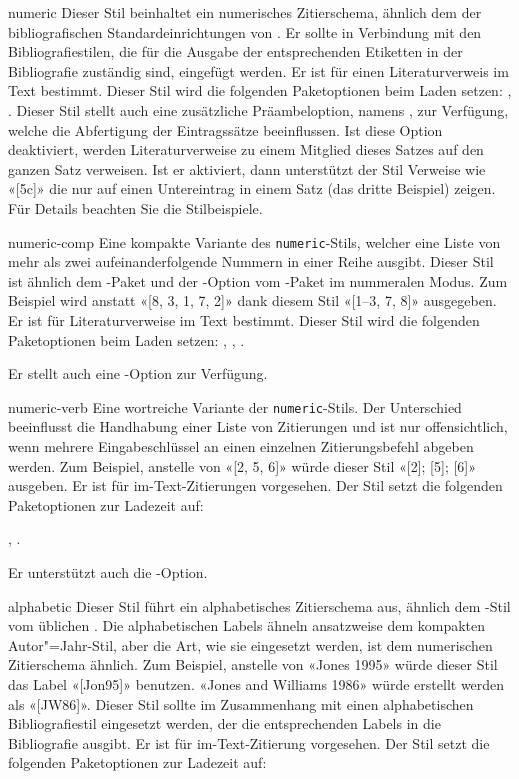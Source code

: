 \documentclass{ltxdockit}[2011/03/25]
\begin{document}
\begin{marglist}

\item[numeric] Dieser Stil beinhaltet ein numerisches Zitierschema, ähnlich dem
der bibliografischen Standardeinrichtungen von \latex. Er sollte in Verbindung
mit den Bibliografiestilen, die für die Ausgabe der entsprechenden Etiketten in
der Bibliografie zuständig sind, eingefügt werden. Er ist für einen
Literaturverweis im Text bestimmt. Dieser Stil wird die folgenden Paketoptionen
beim Laden setzen: , . Dieser
Stil stellt auch eine zusätzliche Präambeloption, namens , zur
Verfügung, welche die Abfertigung der Eintragssätze beeinflussen. Ist diese
Option deaktiviert, werden Literaturverweise zu einem Mitglied dieses Satzes auf
den ganzen Satz verweisen. Ist er aktiviert, dann unterstützt der Stil Verweise
wie «[5c]» die nur auf einen Untereintrag in einem Satz (das dritte Beispiel)
zeigen. Für Details beachten Sie die Stilbeispiele.


\item[numeric-comp] Eine kompakte Variante des \texttt{numeric}-Stils,
welcher
eine Liste von mehr als zwei aufeinanderfolgende Nummern in einer Reihe ausgibt.
Dieser Stil ist ähnlich dem -Paket und der -Option
vom -Paket im nummeralen Modus. Zum Beispiel wird anstatt «[8, 3, 1,
7, 2]» dank diesem Stil «[1--3, 7, 8]» ausgegeben. Er ist für Literaturverweise
im Text bestimmt. Dieser Stil wird die folgenden Paketoptionen beim Laden
setzen:
, , .

Er stellt auch eine -Option zur Verfügung.

\item[numeric-verb] Eine wortreiche Variante der \texttt{numeric}-Stils. Der
Unterschied beeinflusst die Handhabung einer Liste von Zitierungen und ist nur
offensichtlich, wenn mehrere Eingabeschlüssel an einen einzelnen
Zitierungsbefehl abgeben werden. Zum Beispiel, anstelle von «[2, 5, 6]» würde
dieser Stil «[2]; [5]; [6]» ausgeben. Er ist für im-Text-Zitierungen vorgesehen.
Der Stil setzt die folgenden Paketoptionen zur Ladezeit auf:

, .

Er unterstützt auch die -Option.     

\item[alphabetic] Dieser Stil führt ein alphabetisches Zitierschema aus, ähnlich 
dem
-Stil vom üblichen \bibtex. Die alphabetischen Labels ähneln
ansatzweise dem kompakten Autor"=Jahr-Stil, aber die Art, wie sie eingesetzt
werden, ist dem numerischen Zitierschema ähnlich. Zum Beispiel, anstelle von
«Jones 1995» würde dieser Stil das Label «[Jon95]» benutzen. «Jones and Williams
1986» würde erstellt werden als «[JW86]». Dieser Stil sollte im Zusammenhang mit
einen alphabetischen Bibliografiestil eingesetzt werden, der die entsprechenden
Labels in die Bibliografie ausgibt. Er ist für im-Text-Zitierung vorgesehen.
Der Stil setzt die folgenden Paketoptionen zur Ladezeit auf:


\end{marglist}
\end{document}
